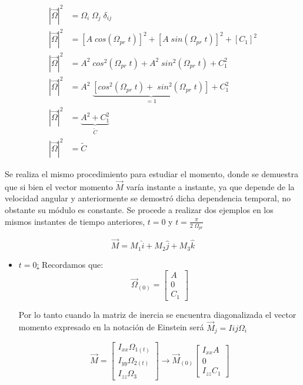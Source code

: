 \documentclass[oneside,a4paper,english,links]{amca}
\begin{document}
\begin{equation}
    \begin{split}
    |\vec{\Omega}|^2&=\Omega_i\;\Omega_j\;\delta_{ij}\\
   |\vec{\Omega}|^2&=\left[A \;cos\left(\Omega_{pr}\;t\right) \right]^2+\left[A \;sin\left(\Omega_{pr}\;t\right) \right]^2+\left[C_1 \right]^2\\
    |\vec{\Omega}|^2&=A^2 \;cos^2\left(\Omega_{pr}\;t\right)+A^2 \;sin^2\left(\Omega_{pr}\;t\right)+C_1^2\\
     |\vec{\Omega}|^2&=A^2 \;\underbrace{\left[ cos^2\left(\Omega_{pr}\;t\right)+ \;sin^2\left(\Omega_{pr}\;t\right)\right]}_{=1}+C_1^2\\
      |\vec{\Omega}|^2&=\underbrace{A^2+C_1^2}_{\tilde{C}}\\
      |\vec{\Omega}|^2&=\tilde{C}
    \end{split}
    \label{eq:cinemat_justif_modulo_omega_cte}
\end{equation}

Se realiza el mismo procedimiento para estudiar el momento, donde se demuestra que si bien el vector momento $\vec{M}$ var\'ia instante a instante, ya que depende de la velocidad angular y anteriormente se demostr\'o dicha dependencia temporal, no obstante su m\'odulo es constante. Se procede a realizar dos ejemplos en los mismos instantes de tiempo anteriores, $t=0$ y $t=\frac{\pi}{2\;\Omega_{pr}}$ 

\begin{equation}
    \vec{M} = M_1 \hat{i} +M_2 \hat{j}+ M_3 \hat{k} 
\end{equation}



\begin{itemize}
    \item \underline{$t=0$:} Recordamos que: 
\begin{equation*}
    \vec{\Omega}_{(0)}=
    \begin{bmatrix}
    A\\
    0\\
    C_1
    \end{bmatrix}
\end{equation*}

\noindent Por lo tanto cuando la matriz de inercia se encuentra diagonalizada el vector momento expresado en la notaci\'on de Einstein ser\'a $\vec{M}_j=I{ij}\Omega_i$

\begin{equation}
    \vec{M}=
\begin{bmatrix}
I_{xx} \Omega_{1(t)} \\
I_{yy} \Omega_{2(t)}  \\
I_{zz}  \Omega_3
\end{bmatrix}\xrightarrow[]{}\vec{M}_{(0)}
\begin{bmatrix}
I_{xx} A \\
    0\\
I_{zz}    C_1
\end{bmatrix}
\label{eq:cinemat_momento_vectorial_t=0}
\end{equation}

\end{itemize}
\end{document}
